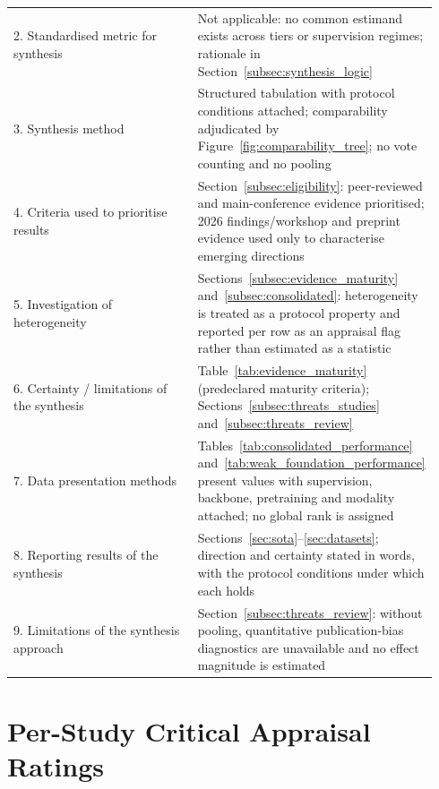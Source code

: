\documentclass[10pt,a4paper]{article}
\begin{document}
\begin{small}
\begin{longtable}{@{}p{0.44\linewidth}p{0.50\linewidth}@{}}
2. Standardised metric for synthesis & Not applicable: no common estimand exists across tiers or supervision regimes; rationale in Section~\ref{subsec:synthesis_logic} \\
3. Synthesis method & Structured tabulation with protocol conditions attached; comparability adjudicated by Figure~\ref{fig:comparability_tree}; no vote counting and no pooling \\
4. Criteria used to prioritise results & Section~\ref{subsec:eligibility}: peer-reviewed and main-conference evidence prioritised; 2026 findings/workshop and preprint evidence used only to characterise emerging directions \\
5. Investigation of heterogeneity & Sections~\ref{subsec:evidence_maturity} and~\ref{subsec:consolidated}: heterogeneity is treated as a protocol property and reported per row as an appraisal flag rather than estimated as a statistic \\
6. Certainty / limitations of the synthesis & Table~\ref{tab:evidence_maturity} (predeclared maturity criteria); Sections~\ref{subsec:threats_studies} and~\ref{subsec:threats_review} \\
7. Data presentation methods & Tables~\ref{tab:consolidated_performance} and~\ref{tab:weak_foundation_performance} present values with supervision, backbone, pretraining and modality attached; no global rank is assigned \\
8. Reporting results of the synthesis & Sections~\ref{sec:sota}--\ref{sec:datasets}; direction and certainty stated in words, with the protocol conditions under which each holds \\
9. Limitations of the synthesis approach & Section~\ref{subsec:threats_review}: without pooling, quantitative publication-bias diagnostics are unavailable and no effect magnitude is estimated \\
\bottomrule
\end{longtable}
\end{small}

\section{Per-Study Critical Appraisal Ratings}
\label{app:appraisal}
\end{document}
